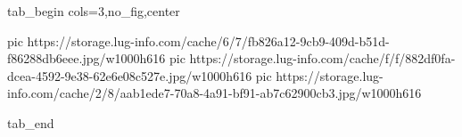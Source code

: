  
 
 
 
 


\ifcmt
  tab_begin cols=3,no_fig,center

     pic https://storage.lug-info.com/cache/6/7/fb826a12-9cb9-409d-b51d-f86288db6eee.jpg/w1000h616%
		 pic https://storage.lug-info.com/cache/f/f/882df0fa-dcea-4592-9e38-62e6e08c527e.jpg/w1000h616%
		 pic https://storage.lug-info.com/cache/2/8/aab1ede7-70a8-4a91-bf91-ab7c62900cb3.jpg/w1000h616%

  tab_end
\fi
